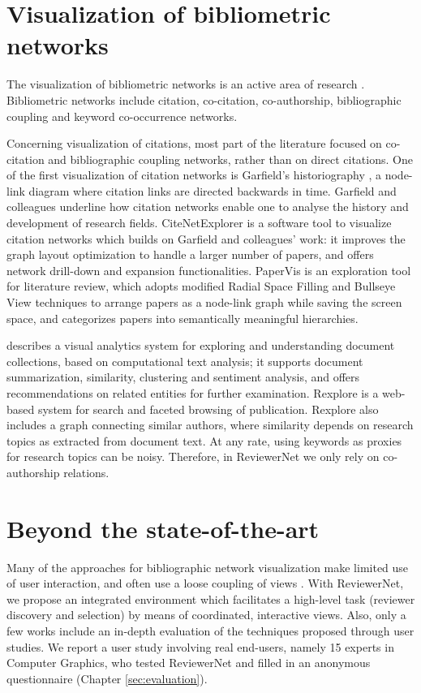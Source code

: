 \section{Visualization of bibliometric networks}
\label{sec:bibvis}
The visualization of bibliometric networks is an active area of research \cite{Ch13,FeHe17}. Bibliometric networks include citation, co-citation, co-authorship, bibliographic coupling and keyword co-occurrence networks. 

Concerning visualization of citations, most part of the literature focused on co-citation and bibliographic coupling networks, rather than on direct citations. One of the first visualization of citation networks is Garfield's historiography \cite{GaPu03}, a node-link diagram where citation links are directed backwards in time. Garfield and colleagues underline how citation networks enable one to analyse the history and development of research fields. CiteNetExplorer \cite{vEWa14} is a software tool to visualize citation networks which builds on Garfield and colleagues' work: it improves the graph layout optimization to handle a larger number of papers, and offers network drill-down and expansion functionalities. PaperVis \cite{ChYa11} is an exploration tool for literature review, which adopts modified Radial Space Filling and Bullseye View techniques to arrange papers as a node-link graph while saving the screen space, and categorizes papers into semantically meaningful hierarchies. 

\cite{GoLi13} describes a visual analytics system for exploring and understanding document collections, based on computational text analysis; it supports document summarization, similarity, clustering and sentiment analysis, and offers recommendations on related entities for further examination. Rexplore \cite{OsMo13} is a web-based system for search and faceted browsing of publication. Rexplore also includes a graph connecting similar authors, where similarity depends on research topics as extracted from document text. At any rate, using keywords as proxies for research topics can be noisy. Therefore, in ReviewerNet we only rely on co-authorship relations.    

\section{Beyond the state-of-the-art}

Many of the approaches for bibliographic network visualization make limited use of user interaction, and often use a loose coupling of views \cite{FeHe17}. With ReviewerNet, we propose an integrated environment which facilitates a high-level task (reviewer discovery and selection) by means of coordinated, interactive views. Also, only a few works include an in-depth evaluation of the techniques proposed through user studies. We report a user study involving real end-users, namely 15 experts in Computer Graphics, who tested ReviewerNet and filled in an anonymous questionnaire (Chapter \ref{sec:evaluation}).  

